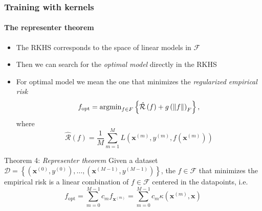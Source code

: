 \documentclass[aspectratio=43]{beamer}
\newcommand{\kernel}[2]{\kappa\left( #1, #2 \right)}
\begin{document}
\begin{frame}
  \frametitle{Training with kernels}
  \framesubtitle{The representer theorem}

  \small
  \begin{itemize}
    \item The RKHS corresponds to the space of linear models in $\mathcal{F}$
    \item Then we can search for the \emph{optimal model} directly in the RKHS
    \item For optimal model we mean the one that minimizes the \emph{regularized empirical risk}
    \[f_{\mathrm{opt}} = \mathrm{argmin}_{f\in F}\left\{ \hat{\mathcal{R}}\left( f \right) + g\left( \norm{f} \right)_F \right\},\]
    where
    \[\hat{\mathcal{R}}\left( f \right) = \frac{1}{M}\sum_{m=1}^M L\left( \mathbf{x}^{(m)}, y^{(m)}, f(\mathbf{x}^{(m)}) \right)\]
  \end{itemize}

  \begin{block}{Theorem 4: \emph{Representer theorem}}
    Given a dataset $\mathcal{D}=\left\{ \left( \mathbf{x}^{(0)}, y^{(0)} \right), \dots, \left( \mathbf{x}^{(M-1)}, y^{(M-1)} \right) \right\}$, the $f\in \mathcal{F}$ that minimizes the empirical risk is a linear combination of $f\in \mathcal{F}$ centered in the datapoints, i.e.
    \[f_{\mathrm{opt}}=\sum_{m=0}^{M-1} c_m f_{\mathbf{x}^{(m)}} = \sum_{m=0}^{M-1} c_m \kernel{\mathbf{x}^{(m)}}{\mathbf{x}}\]
  \end{block}
  

\end{frame}
\end{document}
